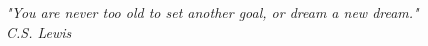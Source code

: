 \begin{titlepage}

\nonumber
\null {}
	\begin{flushright}
	
	\textit{"You are never too old to set another goal, or dream a new dream."} \\[1mm]
	\textit{C.S. Lewis}
	
	\end{flushright}
\end{titlepage}
